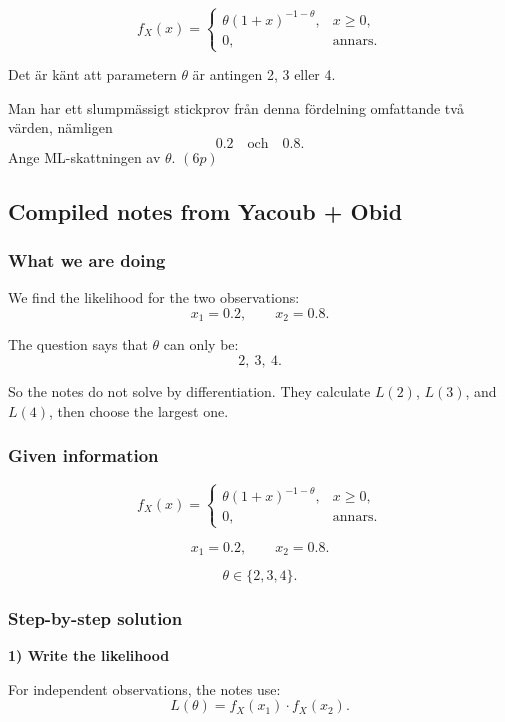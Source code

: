 \documentclass[10pt]{article}
\begin{document}
\[
f_X(x)=
\begin{cases}
\theta(1+x)^{-1-\theta},
& x\ge 0,\\
0,
& \text{annars}.
\end{cases}
\]

Det är känt att parametern \(\theta\) är antingen
2, 3 eller 4.

Man har ett slumpmässigt stickprov från denna
fördelning omfattande två värden, nämligen
\[
0.2
\quad\text{och}\quad
0.8.
\]
Ange ML-skattningen av \(\theta\). \((6p)\)

\subsection*{Compiled notes from Yacoub + Obid}

\subsubsection*{What we are doing}

We find the likelihood for the two observations:
\[
x_1=0.2,
\qquad
x_2=0.8.
\]

The question says that \(\theta\) can only be:
\[
2,\ 3,\ 4.
\]

So the notes do not solve by differentiation.
They calculate \(L(2)\), \(L(3)\), and \(L(4)\),
then choose the largest one.

\subsubsection*{Given information}

\[
f_X(x)=
\begin{cases}
\theta(1+x)^{-1-\theta},
& x\ge 0,\\
0,
& \text{annars}.
\end{cases}
\]

\[
x_1=0.2,
\qquad
x_2=0.8.
\]

\[
\theta\in\{2,3,4\}.
\]

\subsubsection*{Step-by-step solution}

\textbf{1) Write the likelihood}

For independent observations, the notes use:
\[
L(\theta)
=
f_X(x_1)\cdot f_X(x_2).
\]
\end{document}
